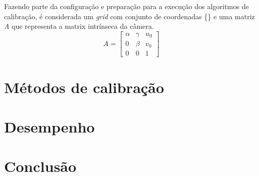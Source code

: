\documentclass[portuguese]{sbrt}
\begin{document}
Fazendo parte da configuração e preparação para a execução dos algoritmos de calibração, é considerada um \textit{grid} com conjunto de coordenadas \{\} e uma matriz \textit{A} que representa a matrix intrínseca da câmera.
  $$
  A =
  \begin{bmatrix}
   \alpha & \gamma & u_{0}\\ 
   0      & \beta  & v_{0}\\
   0      & 0      & 1    
  \end{bmatrix}
  $$
\section{Métodos de calibração}
\label{sec:metodos}

\section{Desempenho} 
\label{sec:desempenho}

\section{Conclusão}
\label{sec:conclusao}
 

\end{document}
